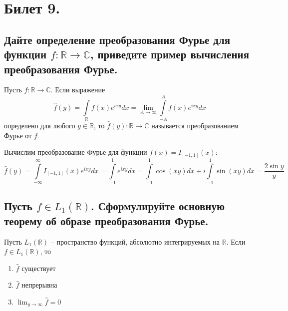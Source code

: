 \section{Билет 9.}

\subsection{Дайте определение преобразования Фурье для функции $f : \mathbb{R} \to \mathbb{C}$, приведите пример вычисления преобразования Фурье.}
\begin{definition}
    Пусть $f : \mathbb{R} \to \mathbb{C}$. Если выражение
    \[
        \hat{f}(y) = \int \limits_{\mathbb{R}} f(x) e^{ixy} dx = \lim_{A \to \infty} \int \limits_{-A}^{A} f(x) e^{ixy} dx
    \]
    определено для любого $y \in \mathbb{R}$, то $\hat{f}(y) : \mathbb{R} \to \mathbb{C}$ называется преобразованием Фурье от $f$.
\end{definition}
Вычислим преобразование Фурье для функции $f(x) = I_{[-1, 1]}(x)$:
\[
    \hat{f}(y) = \int \limits_{-\infty}^{\infty} I_{[-1, 1]}(x) e^{ixy} dx = 
    \int \limits_{-1}^{1} e^{ixy} dx =
    \int \limits_{-1}^{1} \cos(xy) dx + i \int \limits_{-1}^{1} \sin(xy) dx =
    \frac{2 \sin y}{y}
\]

\subsection{Пусть $f \in L_1(\mathbb{R})$. Сформулируйте основную теорему об образе преобразования Фурье.}
\begin{theorem}
    Пусть $L_1(\mathbb{R})$ -- пространство функций, абсолютно интегрируемых на $\mathbb{R}$.
    Если $f \in L_1(\mathbb{R})$, то
    \begin{enumerate}
        \item $\hat{f}$ существует
        \item $\hat{f}$ непрерывна
        \item $\lim_{y \to \infty} \hat{f} = 0$
    \end{enumerate}
\end{theorem}